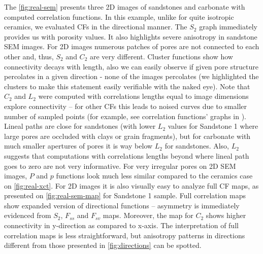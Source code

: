 \documentclass[1p]{elsarticle}
\begin{document}
The \cref{fig:real-sem} presents three 2D images of sandstones and carbonate
with computed correlation functions. In this example, unlike for quite isotropic
ceramics, we evaluated CFs in the directional manner. The $S_2$ graph
immediately provides us with porosity values. It also highlights severe
anisotropy in sandstone SEM images. For 2D images numerous patches of pores are
not connected to each other and, thus, $S_2$ and $C_2$ are very
different. Cluster functions show how connectivity decays with length, also we
can easily observe if given pore structure percolates in a given direction -
none of the images percolates (we highlighted the clusters to make this
statement easily verifiable with the naked eye). Note that $C_2$ and $L_2$ were
computed with correlations lengths equal to image dimensions explore
connectivity -- for other CFs this leads to noised curves due to smaller number
of sampled points (for example, see correlation functions' graphs in
\cite{Euras2012}).  Lineal paths are close for sandstones (with lower $L_2$
values for Sandstone 1 where large pores are occluded with clays or grain
fragments), but for carbonate with much smaller apertures of pores it is way
below $L_2$ for sandstones. Also, $L_2$ suggests that computations with
correlations lengths beyond where lineal path goes to zero are not very
informative. For very irregular pores on 2D SEM images, $P$ and $p$ functions
look much less similar compared to the ceramics case on \cref{fig:real-xct}. For
2D images it is also visually easy to analyze full CF maps, as presented on
\cref{fig:real-sem-map} for Sandstone 1 sample. Full correlation maps show
expanded version of directional functions -- asymmetry is immediately evidenced
from $S_2$, $F_{ss}$ and $F_{sv}$ maps. Moreover, the map for $C_2$ shows higher
connectivity in y-direction as compared to x-axis. The interpretation of full
correlation maps is less straightforward, but anisotropy patterns in directions
different from those presented in \cref{fig:directions} can be spotted.
\end{document}
